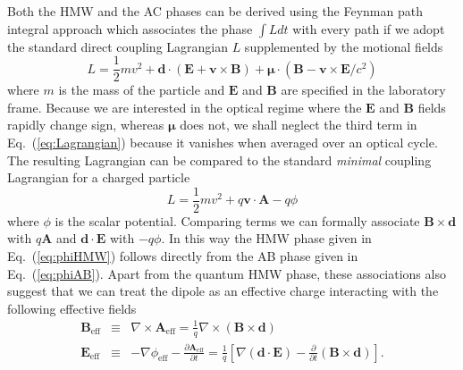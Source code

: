 Both the HMW and the AC phases can be derived using the Feynman path integral approach which associates the phase $\int L dt$ with every path if we adopt the standard direct coupling Lagrangian $L$ supplemented by the motional fields
\begin{equation}
L=\frac{1}{2}m v^2 +  \mathbf{d} \cdot (\mathbf{E}+ \mathbf{v}\times \mathbf{B})+ \boldsymbol{\mu} \cdot (\mathbf{B}- \mathbf{v}\times \mathbf{E}/c^2)  
\label{eq:Lagrangian}
\end{equation}
where $m$ is the mass of the particle and $\mathbf{E}$ and $\mathbf{B}$ are specified in the laboratory frame.  Because we are interested in the optical regime where the $\mathbf{E}$ and $\mathbf{B}$ fields rapidly change sign, whereas $\mathbf{\mu}$ does not, we shall neglect the third term in Eq.\ (\ref{eq:Lagrangian}) because it vanishes when averaged over an optical cycle. The resulting Lagrangian can be compared to the standard \emph{minimal} coupling Lagrangian for a charged particle 
\begin{equation}
L=\frac{1}{2}m v^2 +  q  \mathbf{v} \cdot \mathbf{A} - q \phi
\end{equation}
where $\phi$ is the scalar potential. Comparing terms we can formally associate $\mathbf{B} \times \mathbf{d}$ with $q \mathbf {A}$ and $\mathbf{d} \cdot \mathbf{E}$ with $-q \phi$. In this way the HMW phase given in Eq.\ (\ref{eq:phiHMW}) follows directly from the AB phase given in Eq.\ (\ref{eq:phiAB}). Apart from the quantum HMW phase, these associations also suggest that we can treat the dipole as an effective charge interacting with the following effective fields
\begin{eqnarray}
\mathbf{B}_{\mathrm{eff}}  & \equiv & \nabla \times \mathbf{A}_{\mathrm{eff}} = \frac{1}{q} \nabla \times (\mathbf{B} \times \mathbf{d}) \label{eq:Beff} \\
\mathbf{E}_{\mathrm{eff}}  & \equiv & - \nabla \phi_{\mathrm{eff}} - \frac{\partial \mathbf{A}_{\mathrm{eff}} }{\partial t} = \frac{1}{q} \left[ \nabla (\mathbf{d} \cdot \mathbf{E}) - \frac{\partial}{\partial t} (\mathbf{B} \times \mathbf{d}) \right] . \label{eq:Eeff}
\end{eqnarray}
